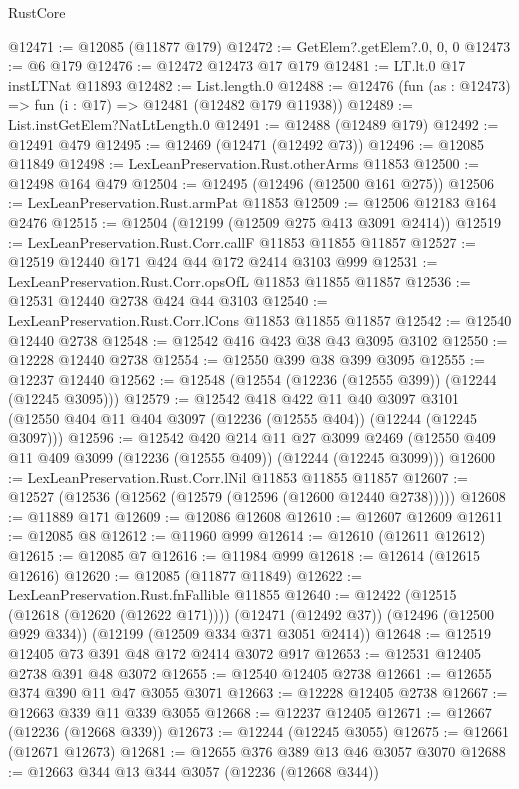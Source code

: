 \begin{lexlean}{RustCore}
\begin{coremodule}
@12471 := @12085 (@11877 @179)
@12472 := GetElem?.getElem?.{0, 0, 0}
@12473 := @6 @179
@12476 := @12472 @12473 @17 @179
@12481 := LT.lt.{0} @17 instLTNat @11893
@12482 := List.length.{0}
@12488 := @12476 (fun (as : @12473) => fun (i : @17) => @12481 (@12482 @179 @11938))
@12489 := List.instGetElem?NatLtLength.{0}
@12491 := @12488 (@12489 @179)
@12492 := @12491 @479
@12495 := @12469 (@12471 (@12492 @73))
@12496 := @12085 @11849
@12498 := LexLeanPreservation.Rust.otherArms @11853
@12500 := @12498 @164 @479
@12504 := @12495 (@12496 (@12500 @161 @275))
@12506 := LexLeanPreservation.Rust.armPat @11853
@12509 := @12506 @12183 @164 @2476
@12515 := @12504 (@12199 (@12509 @275 @413 @3091 @2414))
@12519 := LexLeanPreservation.Rust.Corr.callF @11853 @11855 @11857
@12527 := @12519 @12440 @171 @424 @44 @172 @2414 @3103 @999
@12531 := LexLeanPreservation.Rust.Corr.opsOfL @11853 @11855 @11857
@12536 := @12531 @12440 @2738 @424 @44 @3103
@12540 := LexLeanPreservation.Rust.Corr.lCons @11853 @11855 @11857
@12542 := @12540 @12440 @2738
@12548 := @12542 @416 @423 @38 @43 @3095 @3102
@12550 := @12228 @12440 @2738
@12554 := @12550 @399 @38 @399 @3095
@12555 := @12237 @12440
@12562 := @12548 (@12554 (@12236 (@12555 @399)) (@12244 (@12245 @3095)))
@12579 := @12542
    @418
    @422
    @11
    @40
    @3097
    @3101
    (@12550 @404 @11 @404 @3097 (@12236 (@12555 @404)) (@12244 (@12245 @3097)))
@12596 := @12542
    @420
    @214
    @11
    @27
    @3099
    @2469
    (@12550 @409 @11 @409 @3099 (@12236 (@12555 @409)) (@12244 (@12245 @3099)))
@12600 := LexLeanPreservation.Rust.Corr.lNil @11853 @11855 @11857
@12607 := @12527 (@12536 (@12562 (@12579 (@12596 (@12600 @12440 @2738)))))
@12608 := @11889 @171
@12609 := @12086 @12608
@12610 := @12607 @12609
@12611 := @12085 @8
@12612 := @11960 @999
@12614 := @12610 (@12611 @12612)
@12615 := @12085 @7
@12616 := @11984 @999
@12618 := @12614 (@12615 @12616)
@12620 := @12085 (@11877 @11849)
@12622 := LexLeanPreservation.Rust.fnFallible @11855
@12640 := @12422
    (@12515 (@12618 (@12620 (@12622 @171))))
    (@12471 (@12492 @37))
    (@12496 (@12500 @929 @334))
    (@12199 (@12509 @334 @371 @3051 @2414))
@12648 := @12519 @12405 @73 @391 @48 @172 @2414 @3072 @917
@12653 := @12531 @12405 @2738 @391 @48 @3072
@12655 := @12540 @12405 @2738
@12661 := @12655 @374 @390 @11 @47 @3055 @3071
@12663 := @12228 @12405 @2738
@12667 := @12663 @339 @11 @339 @3055
@12668 := @12237 @12405
@12671 := @12667 (@12236 (@12668 @339))
@12673 := @12244 (@12245 @3055)
@12675 := @12661 (@12671 @12673)
@12681 := @12655 @376 @389 @13 @46 @3057 @3070
@12688 := @12663 @344 @13 @344 @3057 (@12236 (@12668 @344))

\end{coremodule}
\end{lexlean}
